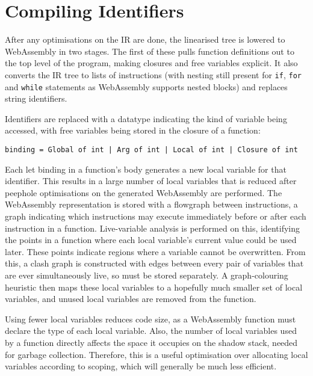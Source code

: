 \section{Compiling Identifiers}
After any optimisations on the IR are done, the linearised tree is lowered to WebAssembly in two stages. The first of these pulls function definitions out to the top level of the program, making closures and free variables explicit. It also converts the IR tree to lists of instructions (with nesting still present for \verb|if|, \verb|for| and \verb|while| statements as WebAssembly supports nested blocks) and replaces string identifiers.


Identifiers are replaced with a datatype indicating the kind of variable being accessed, with free variables being stored in the closure of a function:

\verb"binding = Global of int | Arg of int | Local of int | Closure of int"

Each let binding in a function's body generates a new local variable for that identifier. This results in a large number of local variables that is reduced after peephole optimisations on the generated WebAssembly are performed. 
The WebAssembly representation is stored with a flowgraph between instructions, a graph indicating which instructions may execute immediately before or after each instruction in a function. 
Live-variable analysis is performed on this, identifying the points in a function where each local variable's current value could be used later. These points indicate regions where a variable cannot be overwritten. From this, a clash graph is constructed with edges between every pair of variables that are ever simultaneously live, so must be stored separately. A graph-colouring heuristic then maps these local variables to a hopefully much smaller set of local variables, and unused local variables are removed from the function.

Using fewer local variables reduces code size, as a WebAssembly function must declare the type of each local variable.
Also, the number of local variables used by a function directly affects the space it occupies on the shadow stack, needed for garbage collection. Therefore, this is a useful optimisation over allocating local variables according to scoping, which will generally be much less efficient.


